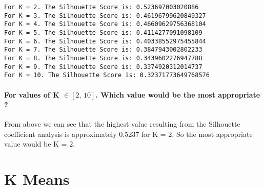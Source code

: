 \documentclass[8pt]{extarticle}
\begin{document}
    \begin{Verbatim}[commandchars=\\\{\}]
For K = 2. The Silhouette Score is: 0.523697003020886
For K = 3. The Silhouette Score is: 0.46196799620849327
For K = 4. The Silhouette Score is: 0.46609629756368104
For K = 5. The Silhouette Score is: 0.4114277091098109
For K = 6. The Silhouette Score is: 0.40338552975455844
For K = 7. The Silhouette Score is: 0.3847943002802233
For K = 8. The Silhouette Score is: 0.3439602276947788
For K = 9. The Silhouette Score is: 0.3374920312014737
For K = 10. The Silhouette Score is: 0.32371773649768576
    \end{Verbatim}

    \hypertarget{for-values-of-k-in-text2-10.-which-value-would-be-the-most-appropriate}{%
\paragraph{\texorpdfstring{For values of K \(\in [\text{2, 10}]\). Which value would be the most
appropriate ? {\newline}}{For values of K \textbackslash in {[}\textbackslash text\{2, 10\}{]}. Which value would be the most appropriate ? }}\label{for-values-of-k-in-text2-10.-which-value-would-be-the-most-appropriate}}

\noindent

From above we can see that the highest value resulting from the Silhouette coefficient analysis is approximately 0.5237 for K = 2. So the most appropriate value would be K = 2.

{\newpage}

    \hypertarget{k-means}{%
\section{K Means}\label{k-means}}
\end{document}
